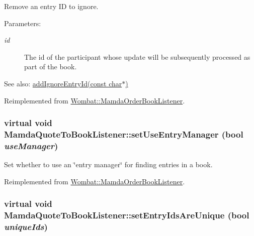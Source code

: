 Remove an entry ID to ignore. 

\begin{Desc}
\item[Parameters:]
\begin{description}
\item[{\em id}]The id of the participant whose update will be subsequently processed as part of the book.\end{description}
\end{Desc}
\begin{Desc}
\item[See also:]\hyperlink{classMamdaQuoteToBookListener_fbd741a8aff801ccb953cf7e5056a359}{add\-Ignore\-Entry\-Id(const char$\ast$)} \end{Desc}


Reimplemented from \hyperlink{classWombat_1_1MamdaOrderBookListener_9bd0ec676f02115594f5f29e0f28e3b9}{Wombat::Mamda\-Order\-Book\-Listener}.\hypertarget{classMamdaQuoteToBookListener_4daf6a6cca90d21bc7902ab6a7ea5008}{
\subsubsection[setUseEntryManager]{\setlength{\rightskip}{0pt plus 5cm}virtual void Mamda\-Quote\-To\-Book\-Listener::set\-Use\-Entry\-Manager (bool {\em use\-Manager})}}
\label{classMamdaQuoteToBookListener_4daf6a6cca90d21bc7902ab6a7ea5008}


Set whether to use an \char`\"{}entry manager\char`\"{} for finding entries in a book. 



Reimplemented from \hyperlink{classWombat_1_1MamdaOrderBookListener_428fd0fee7ccd623c45333d7787b6f70}{Wombat::Mamda\-Order\-Book\-Listener}.\hypertarget{classMamdaQuoteToBookListener_478d71d5ccdbc4d692d7b69df2ed5c91}{
\subsubsection[setEntryIdsAreUnique]{\setlength{\rightskip}{0pt plus 5cm}virtual void Mamda\-Quote\-To\-Book\-Listener::set\-Entry\-Ids\-Are\-Unique (bool {\em unique\-Ids})}}
\label{classMamdaQuoteToBookListener_478d71d5ccdbc4d692d7b69df2ed5c91}


